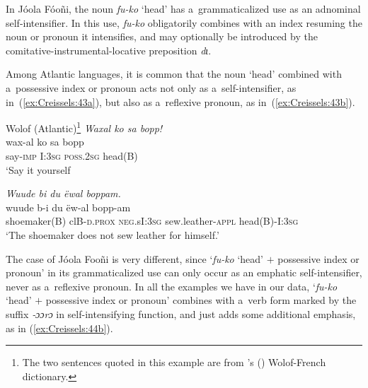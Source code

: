 \documentclass[output=paper]{langscibook}
\begin{document}
In Jóola Fóoñi, the noun \textit{fu-ko} `head' has a~grammaticalized use as an
adnominal self-intensifier.  In this use, \textit{fu-ko} obligatorily combines
with an index resuming the noun or pronoun it intensifies, and may optionally
be introduced by the comitative-instrumental-locative preposition \textit{dɩ}.

Among Atlantic languages, it is common that the noun `head' combined with
a~possessive index or pronoun acts not only as a~self-intensifier, as
in~(\ref{ex:Creissels:43a}), but also as a~reflexive pronoun, as
in~(\ref{ex:Creissels:43b}).

\ea
  \label{ex:Creissels:43}
  Wolof (Atlantic)\footnote{The two sentences quoted in this example are from \citeauthor{Diouf2003}'s (\citeyear{Diouf2003}) Wolof-French dictionary. }
    \ea\label{ex:Creissels:43a}
      \textit{Waxal ko sa bopp!}\\
      \gll wax-al ko sa bopp\\
      say-\textsc{imp} I:\textsc{3sg} \textsc{poss.2sg} head(B)\\
      \glt `Say it yourself
      
    \ex\label{ex:Creissels:43b}
      \textit{Wuude bi du ëwal boppam.}\\
      \gll wuude b-i du ëw-al bopp-am\\
      shoemaker(B) clB-\textsc{d}.\textsc{prox} \textsc{neg}.sI:\textsc{3sg}
      sew.leather-\textsc{appl} head(B)-I:\textsc{3sg}\\
      \glt `The shoemaker does not sew leather for himself.'

  \z
\z

The case of Jóola Fooñi is very different, since `\textit{fu-ko} `head' $+$
possessive index or pronoun' in its grammaticalized use can only occur as an
emphatic self-intensifier, never as a~reflexive pronoun.  In all the examples
we have in our data, `\textit{fu-ko} `head' $+$ possessive index or pronoun'
combines with a~verb form marked by the suffix \textit{‑ɔɔrɔ} in
self-intensifying function, and just adds some additional emphasis, as in (\ref{ex:Creissels:44b}).
\end{document}
